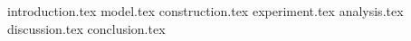 {introduction.tex}
{model.tex}
{construction.tex}
{experiment.tex}
{analysis.tex}
{discussion.tex}
{conclusion.tex}

